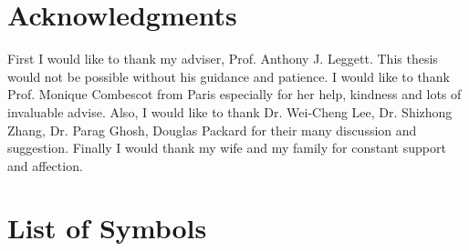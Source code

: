 \documentclass[edeposit,fullpage,prequest]{uiucthesis2009}
\begin{document}
\chapter*{Acknowledgments}
First I would like to thank my adviser, Prof. Anthony J. Leggett.  This thesis would not be possible without his guidance and patience.  I would like to thank Prof. Monique Combescot from Paris especially for her help, kindness and lots of invaluable advise.  Also, I would like to thank Dr. Wei-Cheng Lee, Dr. Shizhong Zhang, Dr. Parag Ghosh,  Douglas
Packard  for their many discussion and suggestion.  Finally I would thank my wife and my family for constant support and affection.  


\tableofcontents

%

\chapter{List of Symbols}
\end{document}
